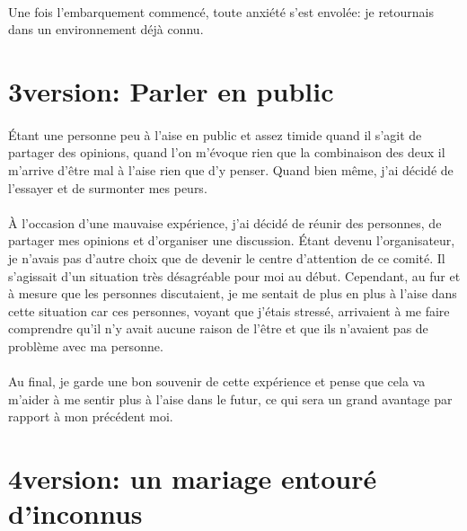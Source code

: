 \paragraph{} Une fois l'embarquement commencé, toute anxiété s'est envolée: je
retournais dans un environnement déjà connu.

\section{3\ieme version: Parler en public}

\paragraph{} Étant une personne peu à l'aise en public et assez timide quand il
s'agit de partager des opinions, quand l'on m'évoque rien que la combinaison
des deux il m'arrive d'être mal à l'aise rien que d'y penser. Quand bien même,
j'ai décidé de l'essayer et de surmonter mes peurs.

\paragraph{} À l'occasion d'une mauvaise expérience, j'ai décidé de réunir des
personnes, de partager mes opinions et d'organiser une discussion. Étant devenu
l'organisateur, je n'avais pas d'autre choix que de devenir le centre
d'attention de ce comité. Il s'agissait d'un situation très désagréable pour
moi au début. Cependant, au fur et à mesure que les personnes discutaient, je
me sentait de plus en plus à l'aise dans cette situation car ces personnes,
voyant que j'étais stressé, arrivaient à me faire comprendre qu'il n'y avait
aucune raison de l'être et que ils n'avaient pas de problème avec ma personne.

\paragraph{} Au final, je garde une bon souvenir de cette expérience et pense
que cela va m'aider à me sentir plus à l'aise dans le futur, ce qui sera un
grand avantage par rapport à mon précédent moi.

\section{4\ieme version: un mariage entouré d'inconnus}

